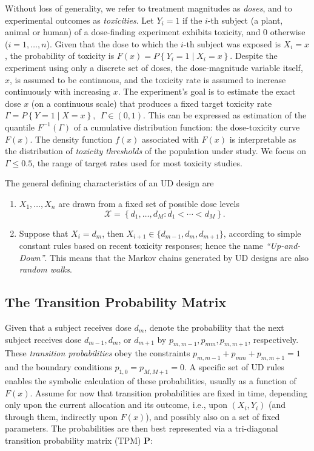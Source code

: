 Without loss of generality, we refer to treatment magnitudes as \emph{doses}, and to experimental outcomes as \emph{toxicities}. Let $Y_i = 1$ if the $i$-th subject (a plant, animal or human) of a dose-finding experiment exhibits toxicity, and $0$ otherwise ($i=1,\ldots ,n$). Given that the dose to which the $i$-th subject was exposed is $X_i=x$, the probability of toxicity is $F(x) = P\left\{Y_i=1\mid X_i =x\right\}$. Despite the experiment using only a discrete set of doses, the dose-magnitude variable itself, $x$, is assumed to be continuous, and the toxicity rate is assumed to increase continuously with increasing $x$.  The experiment's goal is to estimate the exact dose $x$ (on a continuous scale) that produces a fixed target toxicity rate $\Gamma=P\left\{Y=1\mid X=x\right\}, \ \ \Gamma\in(0,1)$. This can be expressed as estimation of the quantile  $F^{-1}(\Gamma)$ of a cumulative distribution function: the dose-toxicity curve $F(x)$.  The density function $f(x)$ associated with $F(x)$ is interpretable as the distribution of \emph{toxicity thresholds} of the population under study. We focus on $\Gamma\leq 0.5$, the range of target rates used for most toxicity studies.

The general defining characteristics of an UD design are
\begin{enumerate}
\item $X_1,\ldots,X_n$ are drawn from a fixed set of possible dose levels $$\mathcal{X} =\left\{d_1,\ldots ,d_M : d_1 <\cdots <d_M\right\}.$$
\item Suppose that $X_i=d_m$, then $X_{i+1}\in\{d_{m-1},d_m,d_{m+1}\}$, according to simple constant rules based on recent toxicity responses; hence the name \emph{``Up-and-Down''}. This means that the Markov chains generated by UD designs are also \emph{random walks}.
\end{enumerate}

\subsection{The Transition Probability Matrix}\label{sec:tpm}

 Given that a subject receives dose $d_m$, denote the probability that the next subject receives dose $d_{m-1},d_m$, or $d_{m+1}$ by $p_{m,m-1},p_{mm},p_{m,m+1}$, respectively. These  \emph{transition probabilities} obey the constraints $p_{m,m-1}+p_{mm}+p_{m,m+1}=1$ and the boundary conditions $p_{1,0}=p_{M,M+1}=0$. A specific set of UD rules enables the symbolic calculation of these probabilities, usually as a function of $F(x)$. Assume for now that transition probabilities are fixed in time, depending only upon the current allocation and its outcome, i.e., upon $\left(X_i,Y_i\right)$ (and through them, indirectly upon $F(x)$), and possibly also on a set of fixed parameters. The probabilities are then best represented via a tri-diagonal transition probability matrix (TPM) $\mathbf{P}$:

